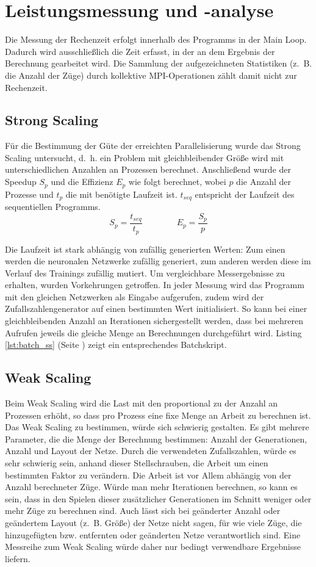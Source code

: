 \section{Leistungsmessung und -analyse}

Die Messung der Rechenzeit erfolgt innerhalb des Programms in der Main Loop.
Dadurch wird ausschließlich die Zeit erfasst, in der an dem Ergebnis der
Berechnung gearbeitet wird.  Die Sammlung der aufgezeichneten Statistiken
(z.~B. die Anzahl der Züge) durch kollektive MPI-Operationen zählt damit nicht
zur Rechenzeit.

\subsection{Strong Scaling}
Für die Bestimmung der Güte der erreichten Parallelisierung wurde das Strong
Scaling untersucht, d.~h. ein Problem mit gleichbleibender Größe wird mit
unterschiedlichen Anzahlen an Prozessen berechnet. Anschließend wurde der
Speedup $S_p$ und die Effizienz  $E_p$ wie folgt berechnet, wobei $p$ die
Anzahl der Prozesse und $t_p$ die mit benötigte Laufzeit ist. $t_{seq}$
entspricht der Laufzeit des sequentiellen Programms.
\begin{equation*}
    S_p = \frac{t_{seq}}{t_p} \qquad\qquad E_p = \frac{S_p}{p}
\end{equation*}

Die Laufzeit ist stark abhängig von zufällig generierten Werten: Zum einen
werden die neuronalen Netzwerke zufällig generiert, zum anderen werden diese im
Verlauf des Trainings zufällig mutiert.  Um vergleichbare Messergebnisse zu
erhalten, wurden Vorkehrungen getroffen.  In jeder Messung wird das Programm
mit den gleichen Netzwerken als Eingabe aufgerufen, zudem wird der
Zufallszahlengenerator auf einen bestimmten Wert initialisiert. So kann bei
einer gleichbleibenden Anzahl an Iterationen sichergestellt werden, dass bei
mehreren Aufrufen jeweils die gleiche Menge an Berechnungen durchgeführt wird.
Listing \ref{lst:batch_ss} (Seite \pageref{lst:batch_ss}) zeigt ein
entsprechendes Batchskript.

\subsection{Weak Scaling}
Beim Weak Scaling wird die Last mit den proportional zu der Anzahl an Prozessen
erhöht, so dass pro Prozess eine fixe Menge an Arbeit zu berechnen ist.  Das
Weak Scaling zu bestimmen, würde sich schwierig gestalten. Es gibt mehrere
Parameter, die die Menge der Berechnung bestimmen: Anzahl der Generationen,
Anzahl und Layout der Netze. Durch die verwendeten Zufallszahlen, würde es sehr
schwierig sein, anhand dieser Stellschrauben, die Arbeit um einen bestimmten
Faktor zu verändern. Die Arbeit ist vor Allem abhängig von der Anzahl
berechneter Züge.  Würde man mehr Iterationen berechnen, so kann es sein, dass
in den Spielen dieser zusätzlicher Generationen im Schnitt weniger oder mehr
Züge zu berechnen sind. Auch lässt sich bei geänderter Anzahl oder geändertem
Layout (z.~B. Größe) der Netze nicht sagen, für wie viele Züge, die
hinzugefügten bzw. entfernten oder geänderten Netze verantwortlich sind.  Eine
Messreihe zum Weak Scaling würde daher nur bedingt verwendbare Ergebnisse
liefern.
